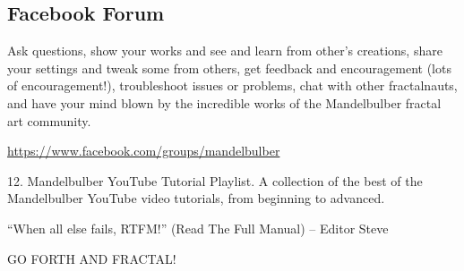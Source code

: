 \subsection{Facebook Forum}\label{qsg-facebook}
Ask questions, show your works and see and learn from other’s creations, share your settings and tweak some from others, get feedback and encouragement (lots of encouragement!), troubleshoot issues or problems, chat with other fractalnauts, and have your mind blown by the incredible works of the Mandelbulber fractal art community. 

\href{https://www.facebook.com/groups/mandelbulber}{https://www.facebook.com/groups/mandelbulber}

    12. Mandelbulber YouTube Tutorial Playlist. A collection of the best of the Mandelbulber YouTube video tutorials, from beginning to advanced. 

“When all else fails, RTFM!” (Read The Full Manual) – Editor Steve

GO FORTH AND FRACTAL!